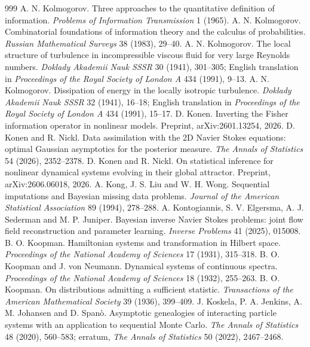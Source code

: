 \begin{thebibliography}{999}
 A. N. Kolmogorov. Three approaches to the quantitative definition of information. \emph{Problems of Information Transmission} 1 (1965).
 A. N. Kolmogorov. Combinatorial foundations of information theory and the calculus of probabilities. \emph{Russian Mathematical Surveys} 38 (1983), 29--40.
 A. N. Kolmogorov. The local structure of turbulence in incompressible viscous fluid for very large Reynolds numbers. \emph{Doklady Akademii Nauk SSSR} 30 (1941), 301--305; English translation in \emph{Proceedings of the Royal Society of London A} 434 (1991), 9--13.
 A. N. Kolmogorov. Dissipation of energy in the locally isotropic turbulence. \emph{Doklady Akademii Nauk SSSR} 32 (1941), 16--18; English translation in \emph{Proceedings of the Royal Society of London A} 434 (1991), 15--17.
 D. Konen. Inverting the Fisher information operator in nonlinear models. Preprint, arXiv:2601.13254, 2026.
 D. Konen and R. Nickl. Data assimilation with the 2D Navier Stokes equations: optimal Gaussian asymptotics for the posterior measure. \emph{The Annals of Statistics} 54 (2026), 2352--2378.
 D. Konen and R. Nickl. On statistical inference for nonlinear dynamical systems evolving in their global attractor. Preprint, arXiv:2606.06018, 2026.
 A. Kong, J. S. Liu and W. H. Wong. Sequential imputations and Bayesian missing data problems. \emph{Journal of the American Statistical Association} 89 (1994), 278--288.
 A. Kontogiannis, S. V. Elgersma, A. J. Sederman and M. P. Juniper. Bayesian inverse Navier Stokes problems: joint flow field reconstruction and parameter learning. \emph{Inverse Problems} 41 (2025), 015008.
 B. O. Koopman. Hamiltonian systems and transformation in Hilbert space. \emph{Proceedings of the National Academy of Sciences} 17 (1931), 315--318.
 B. O. Koopman and J. von Neumann. Dynamical systems of continuous spectra. \emph{Proceedings of the National Academy of Sciences} 18 (1932), 255--263.
 B. O. Koopman. On distributions admitting a sufficient statistic. \emph{Transactions of the American Mathematical Society} 39 (1936), 399--409.
 J. Koskela, P. A. Jenkins, A. M. Johansen and D. Span\`o. Asymptotic genealogies of interacting particle systems with an application to sequential Monte Carlo. \emph{The Annals of Statistics} 48 (2020), 560--583; erratum, \emph{The Annals of Statistics} 50 (2022), 2467--2468.

\end{thebibliography}

